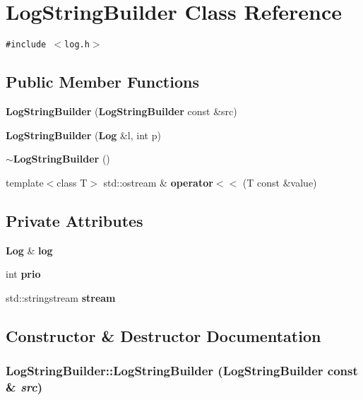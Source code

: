 \section{Log\-String\-Builder Class Reference}
\label{classLogStringBuilder}
{\tt \#include $<$log.h$>$}

\subsection*{Public Member Functions}
\begin{CompactItemize}
\item 
{\bf Log\-String\-Builder} ({\bf Log\-String\-Builder} const \&src)
\item 
{\bf Log\-String\-Builder} ({\bf Log} \&l, int p)
\item 
{\bf $\sim$Log\-String\-Builder} ()
\item 
template$<$class T$>$ std::ostream \& {\bf operator$<$$<$} (T const \&value)
\end{CompactItemize}
\subsection*{Private Attributes}
\begin{CompactItemize}
\item 
{\bf Log} \& {\bf log}
\item 
int {\bf prio}
\item 
std::stringstream {\bf stream}
\end{CompactItemize}


\subsection{Constructor \& Destructor Documentation}
\subsubsection{\setlength{\rightskip}{0pt plus 5cm}Log\-String\-Builder::Log\-String\-Builder ({\bf Log\-String\-Builder} const \& {\em src})}\label{classLogStringBuilder_5df8c8d7ab7615c8552de3d4d21d3417}


